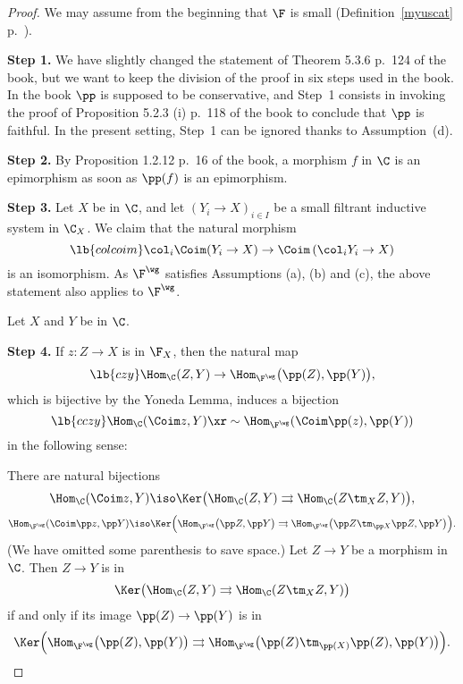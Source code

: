 \documentclass[12pt]{article}
\theoremstyle{remark}
\theoremstyle{definition}
\begin{document}
\begin{proof} %
We may assume from the beginning that $\F$ is small (Definition~\ref{myuscat} p.~).

\nn\textbf{Step 1.} We have slightly changed the statement of Theorem 5.3.6 p.~124 of the book, but we want to keep the division of the proof in six steps used in the book. In the book $\pp$ is supposed to be conservative, and Step~1 consists in invoking the proof of Proposition 5.2.3 (i) p.~118 of the book to conclude that $\pp$ is faithful. In the present setting, Step~1 can be ignored thanks to Assumption~(d).

\nn\textbf{Step 2.} By Proposition 1.2.12 p.~16 of the book, a morphism $f$ in $\C$ is an epimorphism as soon as $\pp(f)$ is an epimorphism.

\nn\textbf{Step 3.} Let $X$ be in $\C$, and let $(Y_i\to X)_{i\in I}$ be a small filtrant inductive system in $\C_X$. We claim that the natural morphism
\begin{equation}\lb{colcoim}
\col_i\Coim(Y_i\to X)\to\Coim\left(\col_iY_i\to X\right)
\end{equation}
is an isomorphism. As $\F^\wg$ satisfies Assumptions (a), (b) and (c), the above statement also applies to $\F^\wg$.

Let $X$ and $Y$ be in $\C$.

\nn\textbf{Step 4.} If $z:Z\to X$ is in $\F_X$, then the natural map 
\begin{equation}\lb{czy}
\Hom_\C(Z,Y)\to\Hom_{\F^\wg}\big(\pp(Z),\pp(Y)\big),
\end{equation} 
which is bijective by the Yoneda Lemma, induces a bijection 
\begin{equation}\lb{cczy}
\Hom_\C(\Coim z,Y)\xr\sim\Hom_{\F^\wg}(\Coim\pp(z),\pp(Y))
\end{equation} 
in the following sense:

There are natural bijections 
$$
\Hom_\C(\Coim z,Y)\iso\Ker\big(\Hom_\C(Z,Y)\rightrightarrows\Hom_\C(Z\tm_XZ,Y)\big),
$$
$$
\Hom_{\F^\wg}(\Coim\pp z,\pp Y)\iso\Ker\Big(\Hom_{\F^\wg}\big(\pp Z,\pp Y\big)\rightrightarrows\Hom_{\F^\wg}\big(\pp Z\tm_{\pp X}\pp Z,\pp Y\big)\Big).
$$ 
(We have omitted some parenthesis to save space.) Let $Z\to Y$ be a morphism in $\C$. Then $Z\to Y$ is in %
$$
\Ker\big(\Hom_\C(Z,Y)\rightrightarrows\Hom_\C(Z\tm_XZ,Y)\big)
$$ 
if and only if its image $\pp(Z)\to\pp(Y)$ is in 
$$
\Ker\Big(\Hom_{\F^\wg}\big(\pp(Z),\pp(Y)\big)\rightrightarrows\Hom_{\F^\wg}\big(\pp(Z)\tm_{\pp(X)}\pp(Z),\pp(Y)\big)\Big).
$$ 


\end{proof}
\end{document}
